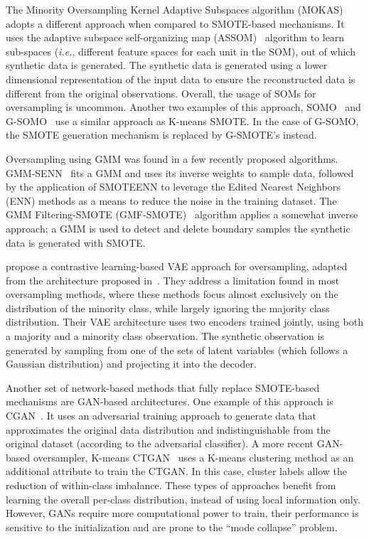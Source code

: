 \documentclass[parskip=full]{scrartcl}
\begin{document}
The Minority Oversampling Kernel Adaptive Subspaces algorithm
(MOKAS)~\cite{lin2017minority} adopts a different approach when compared to
SMOTE-based mechanisms. It uses the adaptive subspace self-organizing map
(ASSOM)~\cite{kohonen1996emergence} algorithm to learn sub-spaces
(\textit{i.e.}, different feature spaces for each unit in the SOM), out of
which synthetic data is generated. The synthetic data is generated using a
lower dimensional representation of the input data to ensure the reconstructed
data is different from the original observations. Overall, the usage of SOMs
for oversampling is uncommon. Another two examples of this approach,
SOMO~\cite{douzas2017self} and G-SOMO~\cite{douzas2021g} use a similar
approach as K-means SMOTE\@. In the case of G-SOMO, the SMOTE
generation mechanism is replaced by G-SMOTE's instead.

Oversampling using GMM was found in a few recently proposed algorithms.
GMM-SENN~\cite{xing2022predict} fits a GMM and uses its inverse weights to
sample data, followed by the application of SMOTEENN to leverage the Edited
Nearest Neighbors (ENN) methods as a means to reduce the noise in the training
dataset. The GMM Filtering-SMOTE (GMF-SMOTE)~\cite{xu2022synthetic} algorithm
applies a somewhat inverse approach; a GMM is used to detect and delete
boundary samples the synthetic data is generated with SMOTE.

\citet{dai2019generative} propose a contrastive learning-based VAE approach
for oversampling, adapted from the architecture proposed
in~\cite{abid2019contrastive}. They address a limitation found in most
oversampling methods, where these methods focus almost exclusively on the
distribution of the minority class, while largely ignoring the majority class
distribution. Their VAE architecture uses two encoders trained jointly, using
both a majority and a minority class observation. The synthetic observation is
generated by sampling from one of the sets of latent variables (which follows
a Gaussian distribution) and projecting it into the decoder.

Another set of network-based methods that fully replace SMOTE-based mechanisms
are GAN-based architectures. One example of this approach is
CGAN~\cite{douzas2018effective}. It uses an adversarial training approach to
generate data that approximates the original data distribution and
indistinguishable from the original dataset (according to the adversarial
classifier). A more recent GAN-based oversampler, K-means CTGAN~\cite{an2021k}
uses a K-means clustering method as an additional attribute to train the
CTGAN\@. In this case, cluster labels allow the reduction of within-class
imbalance. These types of approaches benefit from learning the overall
per-class distribution, instead of using local information only. However, GANs
require more computational power to train, their performance is sensitive to
the initialization and are prone to the ``mode collapse'' problem.
\end{document}
